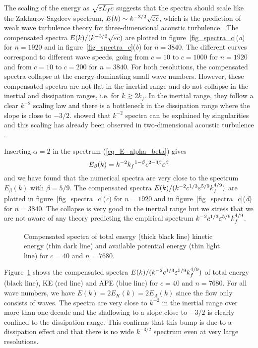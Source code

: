 The scaling of the energy as $\sqrt{\varepsilon L_f c}$ suggests that the
spectra should scale like the Zakharov-Sagdeev spectrum, $E(k) \sim
k^{-3/2}\sqrt{\varepsilon c}$, which is the prediction of weak wave
turbulence theory for three-dimensional acoustic turbulence
\cite[]{Nazarenko2011}.
%
The compensated spectra $E(k) / ( k^{-3/2}\sqrt{\varepsilon c})$ are plotted
in figure~\ref{fig_spectra_c}(\textit{a}) for $n = 1920$ and in
figure~\ref{fig_spectra_c}(\textit{b}) for $n = 3840$.  The different
curves correspond to different wave speeds, going from $c=10$ to
$c=1000$ for $n = 1920$ and from $c=10$ to $c=200$ for $n = 3840$.
%
For both resolutions, the compensated spectra collapse at the
energy-dominating small wave numbers.
%
However, these compensated spectra are not flat in the inertial range
and do not collapse in the inertial and dissipation ranges, i.e. for
$k\gtrsim 2k_f$.  In the inertial range, they follow a clear $k^{-2}$
scaling law and there is a bottleneck in the dissipation range where
the slope is close to $-3/2$.
%
\cite{Kuznetsov2004} showed that $k^{-2}$ spectra can be explained by
singularities and this scaling has already been observed in
two-dimensional acoustic turbulence \cite[]{FalkovichMeyer1996}.
%

Inserting $\alpha = 2$ in the spectrum (\ref{eq_E_alpha_beta}) gives
\begin{equation}
E_\beta(k) = k^{-2} {k_f}^{1-\beta} c^{2-3\beta} \varepsilon^\beta  
\end{equation}
and we have found that the numerical spectra are very close to the
spectrum $E_\beta(k)$ with $\beta = 5/9$.
%
The compensated spectra $E(k) / ( k^{-2} c^{1/3} \varepsilon^{5/9} k_f^{4/9}
)$ are plotted in figure~\ref{fig_spectra_c}(\textit{c}) for $n =
1920$ and in figure~\ref{fig_spectra_c}(\textit{d}) for $n = 3840$.
The collapse is very good in the inertial range but we stress that we
are not aware of any theory predicting the empirical spectrum $k^{-2}
c^{1/3} \varepsilon^{5/9} k_f^{4/9}$.





\begin{figure}
\caption{Compensated spectra
of total energy (thick black line)
kinetic energy (thin dark line) and
available potential energy (thin light line)
for $c = 40$ and $n = 7680$.}
\label{fig_spectra_c40}
\end{figure}

Figure~\ref{fig_spectra_c40} shows the compensated spectra $E(k) / (
k^{-2} c^{1/3} \varepsilon^{5/9} k_f^{4/9} )$ of total energy (black line),
KE (red line) and APE (blue line) for $c = 40$ and $n = 7680$.  For
all wave numbers, we have $E(k) = 2E_K(k) = 2E_A(k)$ since the flow
only consists of  waves.
%
The spectra are very close to $k^{-2}$ in the inertial range over more
than one decade and the shallowing to a slope close to $-3/2$ is
clearly confined to the dissipation range.  This confirms that this
bump is due to a dissipation effect and that there is no wide
$k^{-3/2}$ spectrum even at very large resolutions.


